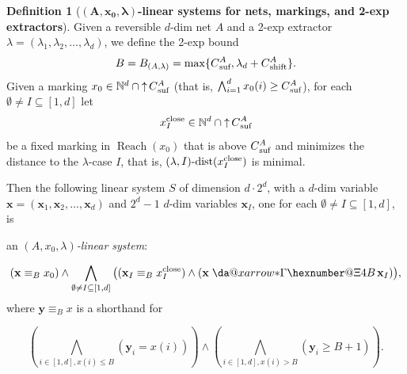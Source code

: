 \documentclass[11pt,a4paper]{amsart}
\makeatletter
\DeclareMathOperator{\Reach}{Reach}
\newcommand{\virtual}[1]{\mathrel{\xdashrightarrow{#1}}\hspace{-0.3em}}
\newcommand{\dist}[3]{(#1,#2)\text{-dist}(#3)}
\newcommand{\bvar}[1]{\mathbf{#1}}
\newcommand{\upC}[1]{\mathop{\uparrow}#1}
\newcommand{\suf}{{}_\textnormal{suf}}
\newcommand{\shift}{{}_\textnormal{shift}}
\newcommand{\close}{\textnormal{close}}
\newcommand{\Nat}{\mathbb{N}}
\newcommand{\setN}{\Nat}
\newcommand*{\da@rightarrow}{\mathchar"0\hexnumber@\symAMSa 4B }
\newcommand*{\xdashrightarrow}[2][]{%
  \mathrel{%
    \mathpalette{\da@xarrow{#1}{#2}{}\da@rightarrow{\,}{}}{}%
  }%
}
\newcommand*{\da@xarrow}[7]{%
  \sbox0{$\ifx#7\scriptstyle\scriptscriptstyle\else\scriptstyle\fi#5#1#6\m@th$}%
  \sbox2{$\ifx#7\scriptstyle\scriptscriptstyle\else\scriptstyle\fi#5#2#6\m@th$}%
  \sbox4{$#7\dabar@\m@th$}%
  \dimen@=\wd0 %
  \ifdim\wd2 >\dimen@
    \dimen@=\wd2 %
  \fi
  \count@=2 %
  \def\da@bars{\dabar@\dabar@}%
  \@whiledim\count@\wd4<\dimen@\do{%
    \advance\count@\@ne
    \expandafter\def\expandafter\da@bars\expandafter{%
      \da@bars
      \dabar@ 
    }%
  }%
  \mathrel{#3}%
  \mathrel{%
    \mathop{\da@bars}\limits
    \ifx\\#1\\%
    \else
      _{\copy0}%
    \fi
    \ifx\\#2\\%
    \else
      ^{\copy2}%
    \fi
  }%
  \mathrel{#4}%
}
\theoremstyle{plain}
\theoremstyle{definition}
\newtheorem{defi}[thm]{Definition}
\theoremstyle{defC}
\theoremstyle{thmC}
\makeatother
\begin{document}
\begin{defi}[\textbf{$\bm{(A,x_0,\lambda)}$-linear systems for nets,
	markings, and 2-exp extractors}]\label{def:crucialLS}
Given a reversible $d$-dim net $A$ and a 2-exp extractor
	$\lambda=(\lambda_1,\lambda_2,\dots,\lambda_d)$,
	we define
the 2-exp bound	\begin{equation}\label{eq:BAffnets}
	B=B_{(A,\lambda)}=\max\{C\suf^A,\lambda_d+C\shift^A\}.
	\end{equation}
	Given a marking $x_0\in\setN^d\cap\upC{C\suf^A}$ (that is, 
	$\bigwedge_{i=1}^d x_0(i)\geq C\suf^A$), for each $\emptyset\neq I\subseteq[1,d]$ let 
	\[x^\close_I\in \setN^d\cap\upC{C\suf^A}\]
	be a fixed marking in $\Reach(x_0)$
	that is above $C\suf^A$ and minimizes the distance to
	the $\lambda$-case $I$, that is, $\dist{\lambda}{I}{x^\close_I}$ is
	minimal. 

Then the following 
linear system $S$ of dimension $d\cdot 2^d$, with
	a $d$-dim variable
	$\bvar{x}=(\bvar{x}_1,\bvar{x}_2,\dots,\bvar{x}_d)$ and $2^d-1$ $d$-dim variables 
	$\bvar{x}_I$, one for each $\emptyset\neq I\subseteq[1,d]$,
	is 
	\begin{center}
		an \emph{$(A,x_0,\lambda)$-linear system}:
	\end{center}		
\begin{equation}\label{eq:AxLS}
	(\bvar{x}\equiv_B x_0)
	\land
	\bigwedge_{\emptyset\neq I\subseteq[1,d]}\big((\bvar{x}_I\equiv_B x^\close_I)\land
	(\bvar{x}\virtual{*}\bvar{x}_I)\big),
\end{equation}
	where $\bvar{y}\equiv_B x$ is a shorthand for 

	\[\left(\bigwedge_{i\in[1,d], x(i)\leq B}
	(\bvar{y}_i=x(i))\right)\land 
	\left(\bigwedge_{i\in[1,d], x(i)> B} (\bvar{y}_i\geq
	B+1)\right).\]
\end{defi}	
\end{document}
